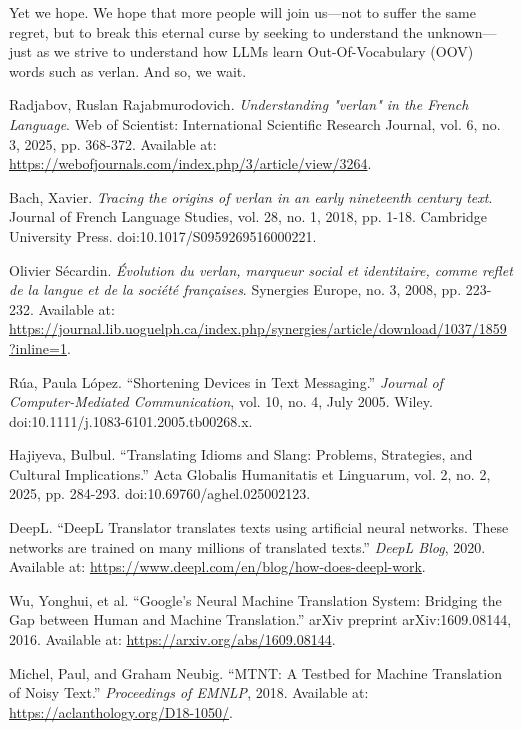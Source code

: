 \documentclass[12pt]{article}
\begin{document}
Yet we hope. 
We hope that more people will join us---not to suffer the same regret, but to break this eternal curse by seeking to understand the unknown\;---\;just as we strive to understand how LLMs learn Out-Of-Vocabulary (OOV) words such as verlan. 
And so, we wait.
\begin{thebibliography}{9}

Radjabov, Ruslan Rajabmurodovich. \textit{Understanding "verlan" in the French Language}. 
Web of Scientist: International Scientific Research Journal, vol. 6, no. 3, 2025, pp. 368-372. 
Available at: \url{https://webofjournals.com/index.php/3/article/view/3264}.

Bach, Xavier. \textit{Tracing the origins of verlan in an early nineteenth century text}. 
Journal of French Language Studies, vol. 28, no. 1, 2018, pp. 1-18. 
Cambridge University Press. doi:10.1017/S0959269516000221.

Olivier Sécardin. \textit{Évolution du verlan, marqueur social et identitaire, comme reflet de la langue et de la société françaises}. 
Synergies Europe, no. 3, 2008, pp. 223-232. 
Available at: \url{https://journal.lib.uoguelph.ca/index.php/synergies/article/download/1037/1859?inline=1}.

Rúa, Paula López. “Shortening Devices in Text Messaging.” 
\textit{Journal of Computer-Mediated Communication}, vol. 10, no. 4, July 2005. 
Wiley. doi:10.1111/j.1083-6101.2005.tb00268.x.

Hajiyeva, Bulbul. “Translating Idioms and Slang: Problems, Strategies, and Cultural Implications.”  
Acta Globalis Humanitatis et Linguarum, vol. 2, no. 2, 2025, pp. 284-293. doi:10.69760/aghel.025002123.  

DeepL. “DeepL Translator translates texts using artificial neural networks. These networks are trained on many millions of translated texts.” 
\textit{DeepL Blog}, 2020. Available at: \url{https://www.deepl.com/en/blog/how-does-deepl-work}.

Wu, Yonghui, et al. “Google's Neural Machine Translation System: Bridging the Gap between Human and Machine Translation.” 
arXiv preprint arXiv:1609.08144, 2016. Available at: \url{https://arxiv.org/abs/1609.08144}.

Michel, Paul, and Graham Neubig. “MTNT: A Testbed for Machine Translation of Noisy Text.”
\textit{Proceedings of EMNLP}, 2018. Available at: \url{https://aclanthology.org/D18-1050/}.


\end{thebibliography}
\end{document}
